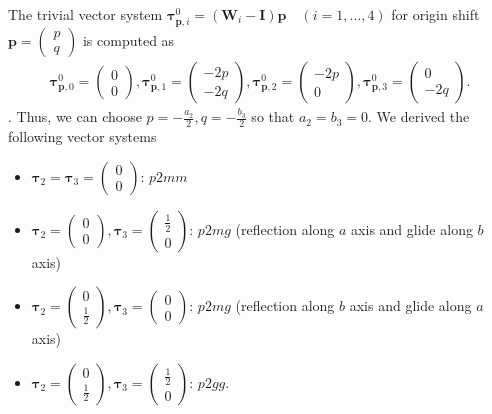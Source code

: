 The trivial vector system $\bm{\tau}^{0}_{\bm{p}, i} = (\bm{W}_{i} - \bm{I}) \bm{p} \quad (i=1,\dots,4)$ for origin shift $\bm{p} = \begin{pmatrix} p \\ q \end{pmatrix}$ is computed as
\begin{align*}
  \bm{\tau}^{0}_{\bm{p}, 0} = \begin{pmatrix} 0 \\ 0 \end{pmatrix},
  \bm{\tau}^{0}_{\bm{p}, 1} = \begin{pmatrix} -2 p \\ -2 q \end{pmatrix},
  \bm{\tau}^{0}_{\bm{p}, 2} = \begin{pmatrix} -2 p \\ 0 \end{pmatrix},
  \bm{\tau}^{0}_{\bm{p}, 3} = \begin{pmatrix} 0 \\ -2 q \end{pmatrix}.
\end{align*}.
Thus, we can choose $p=-\frac{a_{2}}{2}, q=-\frac{b_{3}}{2}$ so that $a_{2} = b_{3} = 0$.
We derived the following vector systems
\begin{itemize}
  \item $\bm{\tau}_{2} = \bm{\tau}_{3} = \begin{pmatrix} 0 \\ 0 \end{pmatrix}$: $p2mm$
  \item $\bm{\tau}_{2} = \begin{pmatrix} 0 \\ 0 \end{pmatrix}, \bm{\tau}_{3} = \begin{pmatrix} \frac{1}{2} \\ 0 \end{pmatrix}$: $p2mg$ (reflection along $a$ axis and glide along $b$ axis)
  \item $\bm{\tau}_{2} = \begin{pmatrix} 0 \\ \frac{1}{2} \end{pmatrix}, \bm{\tau}_{3} = \begin{pmatrix} 0 \\ 0 \end{pmatrix}$: $p2mg$ (reflection along $b$ axis and glide along $a$ axis)
  \item $\bm{\tau}_{2} = \begin{pmatrix} 0 \\ \frac{1}{2} \end{pmatrix}, \bm{\tau}_{3} = \begin{pmatrix} \frac{1}{2} \\ 0 \end{pmatrix}$: $p2gg$.
\end{itemize}
